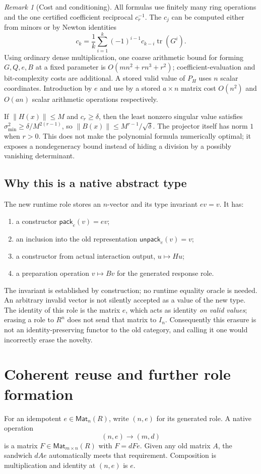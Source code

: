 \documentclass[11pt]{article}
\theoremstyle{definition}
\theoremstyle{remark}
\newtheorem{remark}[theorem]{Remark}
\newcommand{\Mat}{\mathsf{Mat}}
\newcommand{\tr}{\operatorname{tr}}
\begin{document}
\begin{remark}[Cost and conditioning]
All formulas use finitely many ring operations and the one certified coefficient reciprocal $c_r^{-1}$. The $c_j$ can be computed either from minors or by Newton identities
\[
 c_k=\frac1k\sum_{i=1}^k(-1)^{i-1}c_{k-i}\tr(G^i).
\]
Using ordinary dense multiplication, one coarse arithmetic bound for forming $G,Q,e,B$ at a fixed parameter is $O(mn^2+rn^3+r^2)$; coefficient-evaluation and bit-complexity costs are additional. A stored valid value of $P_H$ uses $n$ scalar coordinates. Introduction by $e$ and use by a stored $a\times n$ matrix cost $O(n^2)$ and $O(an)$ scalar arithmetic operations respectively.

If $\|H(x)\|\le M$ and $c_r\ge\delta$, then the least nonzero singular value satisfies $\sigma_{\min}^2\ge\delta/M^{2(r-1)}$, so $\|B(x)\|\le M^{r-1}/\sqrt\delta$. The projector itself has norm $1$ when $r>0$. This does not make the polynomial formula numerically optimal; it exposes a nondegeneracy bound instead of hiding a division by a possibly vanishing determinant.
\end{remark}

\subsection{Why this is a native abstract type}
The new runtime role stores an $n$-vector and its type invariant $ev=v$. It has:
\begin{enumerate}
\item a constructor $\mathsf{pack}_e(v)=ev$;
\item an inclusion into the old representation $\mathsf{unpack}_e(v)=v$;
\item a constructor from actual interaction output, $u\mapsto Hu$;
\item a preparation operation $v\mapsto Bv$ for the generated response role.
\end{enumerate}
The invariant is established by construction; no runtime equality oracle is needed. An arbitrary invalid vector is not silently accepted as a value of the new type. The identity of this role is the matrix $e$, which acts as identity \emph{on valid values}; erasing a role to $R^n$ does not send that matrix to $I_n$. Consequently this erasure is not an identity-preserving functor to the old category, and calling it one would incorrectly erase the novelty.

\section{Coherent reuse and further role formation}
For an idempotent $e\in\Mat_n(R)$, write $(n,e)$ for its generated role. A native operation
\[
                         (n,e)\longrightarrow(m,d)
\]
is a matrix $F\in\Mat_{m\times n}(R)$ with $F=dFe$. Given any old matrix $A$, the sandwich $dAe$ automatically meets that requirement. Composition is multiplication and identity at $(n,e)$ is $e$.
\end{document}
